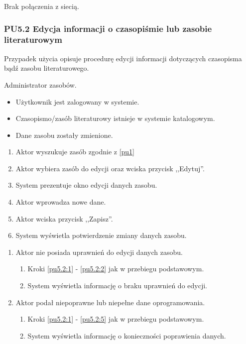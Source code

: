 Brak połączenia z siecią.

\subsubsection{PU5.2 Edycja informacji o czasopiśmie lub zasobie literaturowym}

Przypadek użycia opisuje procedurę edycji informacji dotyczących czasopisma bądź zasobu literaturowego.

Administrator zasobów.

\begin{itemize}
\item Użytkownik jest zalogowany w systemie.
\item Czasopismo/zasób literaturowy istnieje w systemie katalogowym.
\end{itemize}

\begin{itemize}
\item Dane zasobu zostały zmienione.
\end{itemize}

\begin{enumerate}
\item \label{pu5.2:1} Aktor wyszukuje zasób zgodnie z \ref{pu1}
\item \label{pu5.2:2} Aktor wybiera zasób do edycji oraz wciska przycisk ,,Edytuj''.
\item System prezentuje okno edycji danych zasobu.
\item Aktor wprowadza nowe dane.
\item \label{pu5.2:5} Aktor wciska przycisk ,,Zapisz''.
\item System wyświetla potwierdzenie zmiany danych zasobu.
\end{enumerate}

\begin{enumerate}
\item Aktor nie posiada uprawnień do edycji danych zasobu.
	\begin{enumerate}[label*=\arabic*.]
		\item Kroki \ref{pu5.2:1} - \ref{pu5.2:2} jak w przebiegu podstawowym.
		\item System wyświetla informację o braku uprawnień do edycji.
	\end{enumerate}
\item Aktor podał niepoprawne lub niepełne dane oprogramowania.
	\begin{enumerate}[label*=\arabic*.]
		\item Kroki \ref{pu5.2:1} - \ref{pu5.2:5} jak w przebiegu podstawowym.
		\item System wyświetla informację o konieczności poprawienia danych.
	\end{enumerate}
\end{enumerate}

